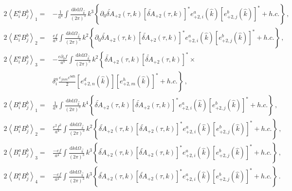 \begin{align}
  2 \left \langle E^a_{i} B^b_{j} \right \rangle_1  = & - \frac{1}{a^4} \int \frac{\textrm{d} k \textrm{d} \Omega_{\vec{k}} }{(2 \pi)^{3}} \, k^3 \left\{ \partial_0 \tilde{\delta A}_{+2}(\tau,  k) \left[ \tilde{\delta A}_{+2}(\tau,  k) \right]^*  e_{+2, i}^a (\hat{k}) \left[ e_{+2, j}^b (\hat{k}) \right]^*  +h. c. \right \} \, , \\
  2 \left \langle E^a_{i} B^b_{j} \right \rangle_2  = & \frac{ e f }{a^4} \int \frac{\textrm{d} k \textrm{d} \Omega_{\vec{k}} }{(2 \pi)^{3}} \, k^2 \left\{ \partial_0 \tilde{\delta A}_{+2}(\tau,  k) \left[ \tilde{\delta A}_{+2}(\tau,  k) \right]^*  e_{+2, i}^a (\hat{k}) \left[ e_{+2, j}^b (\hat{k}) \right]^*  +h. c. \right \} \, ,\\
  2 \left \langle E^a_{i} B^b_{j} \right \rangle_3  = & - \frac{e \partial_0 f}{a^4} \int \frac{\textrm{d} k \textrm{d} \Omega_{\vec{k}} }{(2 \pi)^{3}} \, k^2 \left\{ \tilde{\delta A}_{+2}(\tau,  k) \left[ \tilde{\delta A}_{+2}(\tau,  k) \right]^*  
  \times \right. \nonumber   \\  & \left. 
  \delta^a_i \frac{\varepsilon_{jnm} \varepsilon^{bdh}}{2} \left[ e_{+2, n}^d (\hat{k}) \right] \left[ e_{+2, m}^h (\hat{k}) \right]^*  +h. c. \right \} \, , \\
  2 \left \langle B^a_{i}  B^b_{j} \right \rangle_1  = & \frac{1}{a^4} \int \frac{\textrm{d} k \textrm{d} \Omega_{\vec{k}} }{(2 \pi)^{3}} \, k^4 \left\{ \tilde{\delta A}_{+2}(\tau,  k) \left[ \tilde{\delta A}_{+2}(\tau,  k) \right]^*  e_{+2, i}^a (\hat{k}) \left[ e_{+2, j}^b (\hat{k}) \right]^*  +h. c. \right \} \, , \\
   2 \left \langle B^a_{i}  B^b_{j} \right \rangle_2  = & \frac{e^2 f^2}{a^4} \int \frac{\textrm{d} k \textrm{d} \Omega_{\vec{k}} }{(2 \pi)^{3}} \, k^2 \left\{ \tilde{\delta A}_{+2}(\tau,  k) \left[ \tilde{\delta A}_{+2}(\tau,  k) \right]^*  e_{+2, i}^a (\hat{k}) \left[ e_{+2, j}^b (\hat{k}) \right]^*  +h. c. \right \} \, , \\
   2 \left \langle B^a_{i}  B^b_{j} \right \rangle_3  = & \frac{-ef}{a^4} \int \frac{\textrm{d} k \textrm{d} \Omega_{\vec{k}} }{(2 \pi)^{3}} \, k^3 \left\{ \tilde{\delta A}_{+2}(\tau,  k) \left[ \tilde{\delta A}_{+2}(\tau,  k) \right]^*   e_{+2, i}^a (\hat{k}) \left[ e_{+2, j}^b (\hat{k}) \right]^*  +h. c. \right \}  \, ,\\
  2 \left \langle B^a_{i}  B^b_{j} \right \rangle_4  = & \frac{-ef}{a^4} \int \frac{\textrm{d} k \textrm{d} \Omega_{\vec{k}} }{(2 \pi)^{3}} \, k^3 \left\{ \tilde{\delta A}_{+2}(\tau,  k) \left[ \tilde{\delta A}_{+2}(\tau,  k) \right]^*  e_{+2, i}^a (\hat{k}) \left[ e_{+2, j}^b (\hat{k}) \right]^*  +h. c. \right \} \, .
\end{align}
